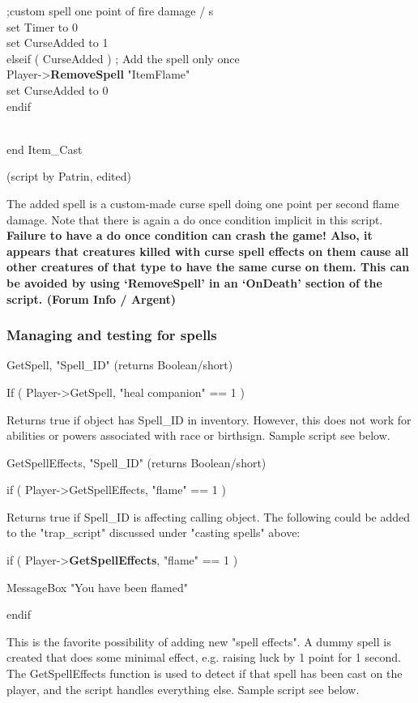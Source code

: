 \documentclass[
]{article}
\begin{document}
;custom spell one point of fire damage / s\\
set Timer to 0\\
set CurseAdded to 1\\
elseif ( CurseAdded ) ; Add the spell only once\\
Player-\textgreater{}\textbf{RemoveSpell} "ItemFlame"\\
set CurseAdded to 0\\
endif\\
\strut \\
end Item\_Cast

(script by Patrin, edited)

The added spell is a custom-made curse spell doing one point per second
flame damage. Note that there is again a do once condition implicit in
this script. \textbf{Failure to have a do once condition can crash the
game! Also, it appears that creatures killed with curse spell effects on
them cause all other creatures of that type to have the same curse on
them. This can be avoided by using `RemoveSpell' in an `OnDeath' section
of the script. (Forum Info / Argent)}

\hypertarget{managing-and-testing-for-spells}{%
\subsubsection{Managing and testing for
spells}\label{managing-and-testing-for-spells}}

GetSpell, "Spell\_ID" (returns Boolean/short)

If ( Player-\textgreater GetSpell, "heal companion" == 1 )

Returns true if object has Spell\_ID in inventory. However, this does
not work for abilities or powers associated with race or birthsign.
Sample script see below.

GetSpellEffects, "Spell\_ID" (returns Boolean/short)

if ( Player-\textgreater GetSpellEffects, "flame" == 1 )

Returns true if Spell\_ID is affecting calling object. The following
could be added to the "trap\_script" discussed under "casting spells"
above:

if ( Player-\textgreater{}\textbf{GetSpellEffects}, "flame" == 1 )

MessageBox "You have been flamed"

endif

This is the favorite possibility of adding new "spell effects". A dummy
spell is created that does some minimal effect, e.g. raising luck by 1
point for 1 second. The GetSpellEffects function is used to detect if
that spell has been cast on the player, and the script handles
everything else. Sample script see below.
\end{document}
